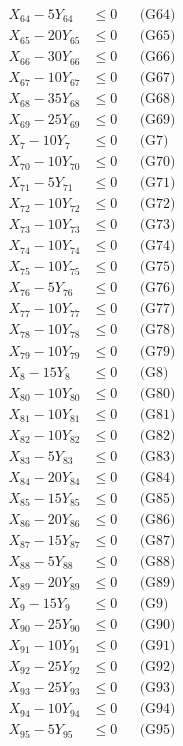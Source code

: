\documentclass[a4paper,10pt]{article}
\begin{document}
{\begin{align}
X_{64} - 5Y_{64} &\leq 0 && \text{(G64)} \\
X_{65} - 20Y_{65} &\leq 0 && \text{(G65)} \\
X_{66} - 30Y_{66} &\leq 0 && \text{(G66)} \\
X_{67} - 10Y_{67} &\leq 0 && \text{(G67)} \\
X_{68} - 35Y_{68} &\leq 0 && \text{(G68)} \\
X_{69} - 25Y_{69} &\leq 0 && \text{(G69)} \\
X_{7} - 10Y_{7} &\leq 0 && \text{(G7)} \\
X_{70} - 10Y_{70} &\leq 0 && \text{(G70)} \\
X_{71} - 5Y_{71} &\leq 0 && \text{(G71)} \\
X_{72} - 10Y_{72} &\leq 0 && \text{(G72)} \\
X_{73} - 10Y_{73} &\leq 0 && \text{(G73)} \\
X_{74} - 10Y_{74} &\leq 0 && \text{(G74)} \\
X_{75} - 10Y_{75} &\leq 0 && \text{(G75)} \\
X_{76} - 5Y_{76} &\leq 0 && \text{(G76)} \\
X_{77} - 10Y_{77} &\leq 0 && \text{(G77)} \\
X_{78} - 10Y_{78} &\leq 0 && \text{(G78)} \\
X_{79} - 10Y_{79} &\leq 0 && \text{(G79)} \\
X_{8} - 15Y_{8} &\leq 0 && \text{(G8)} \\
X_{80} - 10Y_{80} &\leq 0 && \text{(G80)} \\
\allowbreak
X_{81} - 10Y_{81} &\leq 0 && \text{(G81)} \\
X_{82} - 10Y_{82} &\leq 0 && \text{(G82)} \\
X_{83} - 5Y_{83} &\leq 0 && \text{(G83)} \\
X_{84} - 20Y_{84} &\leq 0 && \text{(G84)} \\
X_{85} - 15Y_{85} &\leq 0 && \text{(G85)} \\
X_{86} - 20Y_{86} &\leq 0 && \text{(G86)} \\
X_{87} - 15Y_{87} &\leq 0 && \text{(G87)} \\
X_{88} - 5Y_{88} &\leq 0 && \text{(G88)} \\
X_{89} - 20Y_{89} &\leq 0 && \text{(G89)} \\
X_{9} - 15Y_{9} &\leq 0 && \text{(G9)} \\
X_{90} - 25Y_{90} &\leq 0 && \text{(G90)} \\
X_{91} - 10Y_{91} &\leq 0 && \text{(G91)} \\
X_{92} - 25Y_{92} &\leq 0 && \text{(G92)} \\
X_{93} - 25Y_{93} &\leq 0 && \text{(G93)} \\
X_{94} - 10Y_{94} &\leq 0 && \text{(G94)} \\
X_{95} - 5Y_{95} &\leq 0 && \text{(G95)} \\
\end{align}}
\end{document}
